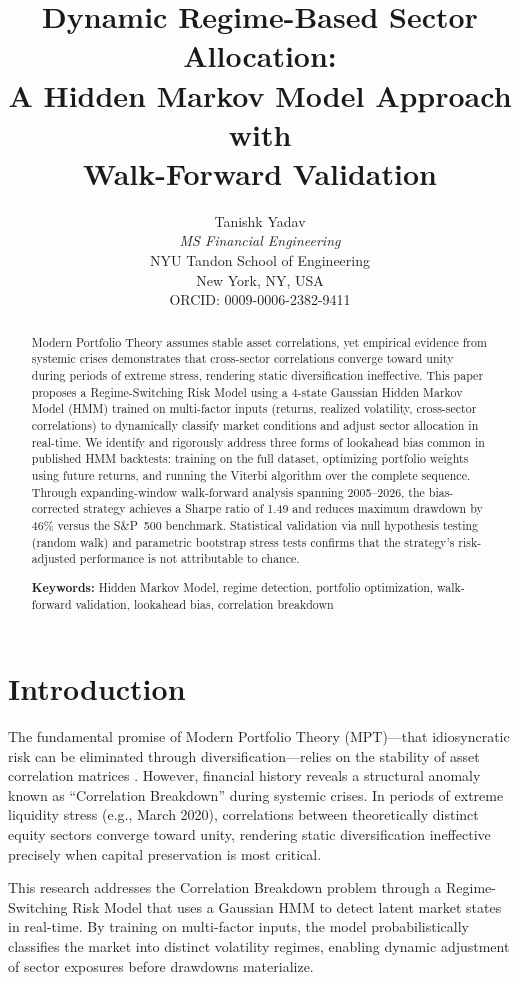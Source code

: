 \documentclass[11pt]{article}
\title{\textbf{Dynamic Regime-Based Sector Allocation:\\A Hidden Markov Model Approach with\\Walk-Forward Validation}}
\author{Tanishk Yadav\\[2pt]\textit{MS Financial Engineering}\\NYU Tandon School of Engineering\\New York, NY, USA\\[2pt]ORCID: 0009-0006-2382-9411}
\date{}
\begin{document}
\maketitle

\begin{abstract}
\noindent
Modern Portfolio Theory assumes stable asset correlations, yet empirical evidence from systemic crises demonstrates that cross-sector correlations converge toward unity during periods of extreme stress, rendering static diversification ineffective. This paper proposes a Regime-Switching Risk Model using a 4-state Gaussian Hidden Markov Model (HMM) trained on multi-factor inputs (returns, realized volatility, cross-sector correlations) to dynamically classify market conditions and adjust sector allocation in real-time. We identify and rigorously address three forms of lookahead bias common in published HMM backtests: training on the full dataset, optimizing portfolio weights using future returns, and running the Viterbi algorithm over the complete sequence. Through expanding-window walk-forward analysis spanning 2005--2026, the bias-corrected strategy achieves a Sharpe ratio of 1.49 and reduces maximum drawdown by 46\% versus the S\&P~500 benchmark. Statistical validation via null hypothesis testing (random walk) and parametric bootstrap stress tests confirms that the strategy's risk-adjusted performance is not attributable to chance.

\medskip
\noindent\textbf{Keywords:} Hidden Markov Model, regime detection, portfolio optimization, walk-forward validation, lookahead bias, correlation breakdown
\end{abstract}

\section{Introduction}

The fundamental promise of Modern Portfolio Theory (MPT)---that idiosyncratic risk can be eliminated through diversification---relies on the stability of asset correlation matrices \citep{markowitz1952}. However, financial history reveals a structural anomaly known as ``Correlation Breakdown'' during systemic crises. In periods of extreme liquidity stress (e.g., March 2020), correlations between theoretically distinct equity sectors converge toward unity, rendering static diversification ineffective precisely when capital preservation is most critical.

This research addresses the Correlation Breakdown problem through a Regime-Switching Risk Model that uses a Gaussian HMM to detect latent market states in real-time. By training on multi-factor inputs, the model probabilistically classifies the market into distinct volatility regimes, enabling dynamic adjustment of sector exposures before drawdowns materialize.
\end{document}
